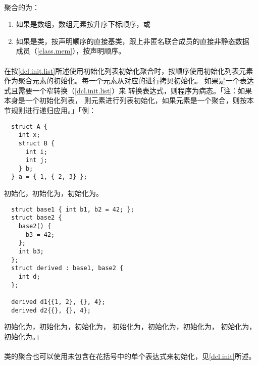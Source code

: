 \paragraph{}
聚合的为：
\begin{enumerate}
  \item{如果是数组，数组元素按升序下标顺序，或}
  \item{如果是类，按声明顺序的直接基类，跟上非匿名联合成员的直接非静态数据
    成员（\ref{class.mem}），按声明顺序。}
\end{enumerate}

\paragraph{}
在按\ref{dcl.init.list}所述使用初始化列表初始化聚合时，按顺序使用初始化列表元素
作为聚合元素的初始化。每一个元素从对应的进行拷贝初始化。
如果是一个表达式且需要一个窄转换（\ref{dcl.init.list}）来
转换表达式，则程序为病态。「注：如果本身是一个初始化列表，
则元素进行列表初始化，如果元素是一个聚合，则按本节规则进行递归应用。」「例：
\begin{lstlisting}
  struct A {
    int x;
    struct B {
      int i;
      int j;
    } b;
  } a = { 1, { 2, 3} };
\end{lstlisting}
初始化，初始化为，初始化为。
\begin{lstlisting}
  struct base1 { int b1, b2 = 42; };
  struct base2 {
    base2() {
      b3 = 42;
    };
    int b3;
  };
  struct derived : base1, base2 {
    int d;
  };

  derived d1{{1, 2}, {}, 4};
  derived d2{{}, {}, 4};
\end{lstlisting}
初始化为，初始化为，初始化为，
初始化为，初始化为，初始化为，
初始化为，初始化为。」

\paragraph{}
类的聚合也可以使用未包含在花括号中的单个表达式来初始化，见\ref{dcl.init}所述。

